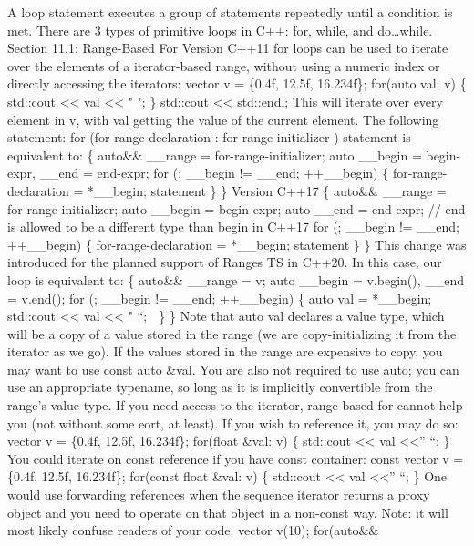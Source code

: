 A loop statement executes a group of statements repeatedly until a
condition is met. There are 3 types of primitive loops in C++: for,
while, and do\ldots while. Section 11.1: Range-Based For Version C++11
for loops can be used to iterate over the elements of a iterator-based
range, without using a numeric index or directly accessing the
iterators: vector v = \{0.4f, 12.5f, 16.234f\}; for(auto val: v) \{
std::cout \textless\textless{} val \textless\textless{} " "; \}
std::cout \textless\textless{} std::endl; This will iterate over every
element in v, with val getting the value of the current element. The
following statement: for (for-range-declaration : for-range-initializer
) statement is equivalent to: \{ auto\&\& \_\_range =
for-range-initializer; auto \_\_begin = begin-expr, \_\_end = end-expr;
for (; \_\_begin != \_\_end; ++\_\_begin) \{ for-range-declaration =
*\_\_begin; statement \} \} Version C++17 \{ auto\&\& \_\_range =
for-range-initializer; auto \_\_begin = begin-expr; auto \_\_end =
end-expr; // end is allowed to be a different type than begin in C++17
for (; \_\_begin != \_\_end; ++\_\_begin) \{ for-range-declaration =
*\_\_begin; statement \} \} This change was introduced for the planned
support of Ranges TS in C++20. In this case, our loop is equivalent to:
\{ auto\&\& \_\_range = v; auto \_\_begin = v.begin(), \_\_end =
v.end(); for (; \_\_begin != \_\_end; ++\_\_begin) \{ auto val =
*\_\_begin; std::cout \textless\textless{} val \textless\textless{} "
``;  \} \} Note that auto val declares a value type, which will be a
copy of a value stored in the range (we are copy-initializing it from
the iterator as we go). If the values stored in the range are expensive
to copy, you may want to use const auto \&val. You are also not required
to use auto; you can use an appropriate typename, so long as it is
implicitly convertible from the range's value type. If you need access
to the iterator, range-based for cannot help you (not without some eort,
at least). If you wish to reference it, you may do so: vector v =
\{0.4f, 12.5f, 16.234f\}; for(float \&val: v) \{ std::cout
\textless\textless{} val \textless\textless{}'' ``; \} You could iterate
on const reference if you have const container: const vector v = \{0.4f,
12.5f, 16.234f\}; for(const float \&val: v) \{ std::cout
\textless\textless{} val \textless\textless{}'' ``; \} One would use
forwarding references when the sequence iterator returns a proxy object
and you need to operate on that object in a non-const way. Note: it will
most likely confuse readers of your code. vector v(10); for(auto\&\&
